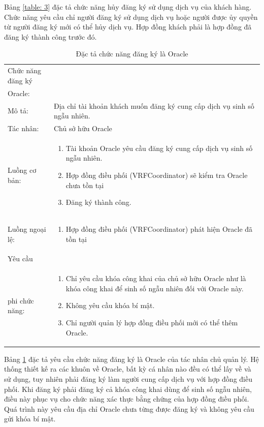 \documentclass[../main.tex]{subfiles}
\begin{document}
Bảng \ref{table: 3} đặc tả chức năng hủy đăng ký sử dụng dịch vụ của khách hàng. Chức năng yêu cầu chỉ người đăng ký sử dụng dịch vụ hoặc người được ủy quyền từ người đăng ký mới có thể hủy dịch vụ. Hợp đồng khách phải là hợp đồng đã đăng ký thành công trước đó.
\begin{table}[H]
\begin{tabularx}{\textwidth}{|l|X|}
Chức năng đăng ký\\Oracle:  &  \\
Mô tả:                  & Địa chỉ tài khoản khách muốn đăng ký cung cấp dịch vụ sinh số ngẫu nhiên.\\
Tác nhân:               & Chủ sở hữu Oracle \\
Luồng cơ bản:           &
\begin{enumerate}
    \item Tài khoản Oracle yêu cầu đăng ký cung cấp dịch vụ sinh số ngẫu nhiên.
    \item Hợp đồng điều phối (VRFCoordinator) sẽ kiểm tra Oracle chưa tồn tại
    \item Đăng ký thành công.
\end{enumerate}\\
Luồng ngoại lệ:         &
\begin{enumerate}
    \item Hợp đồng điều phối (VRFCoordinator) phát hiện Oracle đã tồn tại
\end{enumerate}\\
Yêu cầu                 &\\
phi chức năng:           & 
\begin{enumerate}
    \item Chỉ yêu cầu khóa công khai của chủ sở hữu Oracle như là khóa công khai để sinh số ngẫu nhiên đối với Oracle này.
    \item Không yêu cầu khóa bí mật.
    \item Chỉ người quản lý hợp đồng điều phối mới có thể thêm Oracle.
\end{enumerate}\\
\end{tabularx}
\caption{Đặc tả chức năng đăng ký là Oracle}
\label{table: 4}
\end{table}

Bảng \ref{table: 4} đặc tả yêu cầu chức năng đăng ký là Oracle của tác nhân chủ quản lý. Hệ thống thiết kế ra các khuôn về Oracle, bất kỳ cá nhân nào đều có thể lấy về và sử dụng, tuy nhiên phải đăng ký làm người cung cấp dịch vụ với hợp đồng điều phối. Khi đăng ký phải đăng ký cả khóa công khai dùng để sinh số ngẫu nhiên, điều này phục vụ cho chức năng xác thực bằng chứng của hợp đồng điều phối. Quá trình này yêu cầu địa chỉ Oracle chưa từng được đăng ký và không yêu cầu gửi khóa bí mật.
\end{document}
